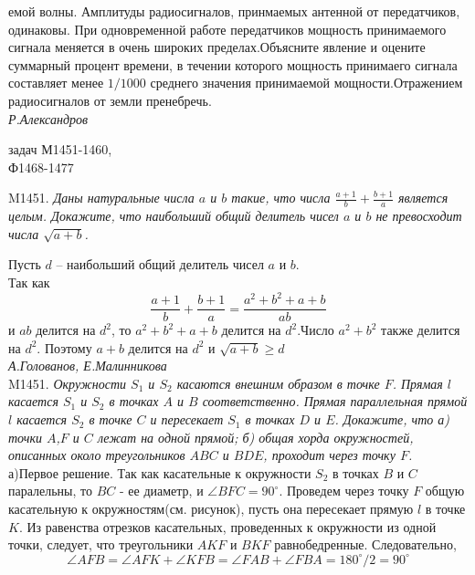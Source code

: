 \documentclass[russian,10pt,a4paper,twocolumn]{article}
\begin{document}
	\noindent
	емой волны. Амплитуды радиосигналов, принмаемых антенной от передатчиков, одинаковы. При одновременной работе передатчиков мощность принимаемого сигнала меняется в очень широких пределах.Объясните явление и оцените суммарный процент времени, в течении которого мощность принимаего сигнала составляет менее $1/1000$ среднего значения принимаемой мощности.Отражением радиосигналов от земли пренебречь.\\
	{\slshape Р.Александров}

	\vspace{20pt}
	
	
	\noindent 
	{ задач М1451-1460,\\Ф1468-1477\\}
	
	
	\noindent M1451. {\slshape Даны натуральные числа $a$ и $b$ такие, что числа $\frac{a+1}{b}+\frac{b+1}{a}$ является целым. Докажите, что наибольший общий делитель чисел $a$ и $b$ не превосходит числа $\sqrt{a+b}$.}
	
	Пусть $d$ -- наибольший общий делитель чисел $a$ и $b$. \\ Так как
	\[
		\frac{a+1}{b} + \frac{b+1}{a} = \frac{a^2 +b^2 +a+b}{ab}   
	\]
	и $ab$ делится на $d^2$, то  $a^2+b^2+a+b$ делится на $d^2$.Число $a^2+b^2$ также делится на $d^2$. Поэтому $a+b$ делится на $d^2$ и $\sqrt{a+b} \ge d$\\
	{\slshape А.Голованов, Е.Малинникова}\\
	
	
	\noindent
	M1451. {\slshape Окружности $S_1$ и $S_2$ касаются внешним образом в точке $F$. Прямая $l$ касается $S_1$ и $S_2$ в точках $A$ и $B$ соответственно. Прямая параллельная прямой $l$ касается $S_2$ в точке $C$ и пересекает $S_1$ в точках $D$ и $E$. Докажите, что а) точки $A$,$F$ и $C$ лежат на одной прямой; б) общая хорда окружностей, описанных около треугольников $ABC$ и $BDE$, проходит через точку $F$. }\\
	
	\noindent
	а)Первое решение. Так как касательные к окружности $S_2$ в точках $B$ и $C$ паралельны, то $BC$ - ее диаметр, и $\angle BFC=90^{\circ}$. Проведем через точку $F$ общую касательную к окружностям(см. рисунок), пусть она пересекает прямую $l$ в точке $K$. Из равенства отрезков касательных, проведенных  к окружности из одной точки, следует, что треугольники $AKF$ и $BKF$ равнобедренные. Следовательно,
	\[
	\angle AFB=\angle AFK + \angle KFB = \angle FAB + \angle FBA = 180^{\circ}/2=90^{\circ}
	\]
	
\end{document}
